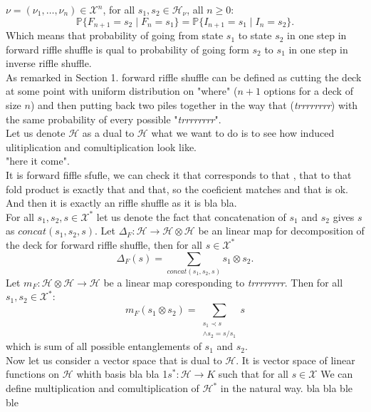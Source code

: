 \documentclass[a4paper, 12pt]{report}
\begin{document}
$\nu = (\nu_1, \dots, \nu_n) \in \mathcal{X}^n$, for all $s_1, s_2 \in \mathcal{H}_\nu$, all $n \geq 0$:
\begin{equation*}
\mathbb{P}\{F_{n+1} = s_2 \mid F_n = s_1\} = \mathbb{P}\{I_{n+1} = s_1 \mid I_n = s_2\}.
\end{equation*} 
Which means that probability of going from state $s_1$ to state $s_2$ in one step in forward riffle shuffle 
is qual to probability of going form $s_2$ to $s_1$ in one step in  inverse riffle shuffle. \\
As remarked in Section 1. forward riffle shuffle can be defined as cutting the deck at some point with 
uniform distribution on "where" ($n+1$ options for a deck of size $n$) and then putting back 
two piles together in the way that  
(\textit{trrrrrrrr}) with 
the same probability of every possible "\textit{trrrrrrrr}". \\
Let us denote $\mathcal{H}$ as a dual to $\mathcal{H}$ what we want to do is to see how induced 
ulitiplication and comultiplication look like. \\
"here it come". \\
It is forward fiffle sfufle, we can check it 
that corresponds to that , that to that
fold product is exactly that and that, so the coeficient matches and that is ok. \\
And then it is exactly an riffle shuffle as it is bla bla. \\
For all $s_1, s_2, s \in \mathcal{X}^*$ let us denote the fact that concatenation of $s_1$ and $s_2$ gives 
$s$ as $concat(s_1, s_2, s)$.
Let $\Delta_F : \mathcal{H} \to \mathcal{H} \otimes \mathcal{H}$ be an linear map for decomposition 
of the deck for forward riffle shuffle, then for all $s \in \mathcal{X}^*$
\begin{equation*}
\Delta_F(s) = \sum_{concat(s_1, s_2, s)} s_1 \otimes s_2.
\end{equation*}
Let $m_F : \mathcal{H} \otimes \mathcal{H} \to \mathcal{H}$ be a linear map coresponding to 
\textit{trrrrrrrr}. Then for all $s_1, s_2 \in \mathcal{X}^*$:
\begin{equation*}
m_F (s_1 \otimes s_2) = \sum_{\substack{s_1 \prec s \\ \land s_2 = s/s_1} } s
\end{equation*}
which is sum of all possible entanglements of $s_1$ and $s_2$.\\[8pt]
Now let us consider a vector space that is dual to $\mathcal{H}$. It is vector space of linear functions on 
$\mathcal{H}$
whith basis bla bla
1$s^* : \mathcal{H} \to K$ such that for all $s \in \mathcal{X }$
We can define multiplication and comultiplication of $\mathcal{H}^*$ in the natural way.
bla bla
ble ble
\end{document}
